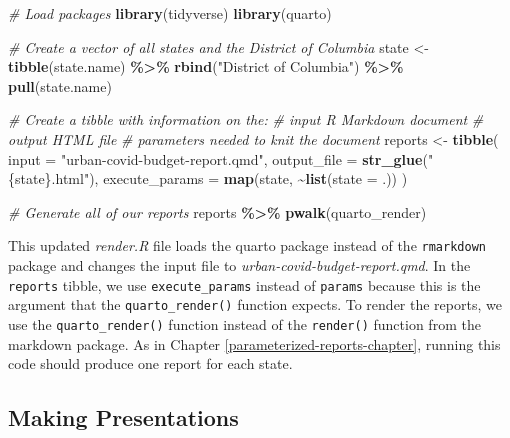 \documentclass[
]{book}
\newenvironment{Shaded}{\begin{snugshade}}{\end{snugshade}}
\newcommand{\AttributeTok}[1]{\textcolor[rgb]{0.13,0.29,0.53}{#1}}
\newcommand{\CommentTok}[1]{\textcolor[rgb]{0.56,0.35,0.01}{\textit{#1}}}
\newcommand{\FunctionTok}[1]{\textcolor[rgb]{0.13,0.29,0.53}{\textbf{#1}}}
\newcommand{\NormalTok}[1]{#1}
\newcommand{\OtherTok}[1]{\textcolor[rgb]{0.56,0.35,0.01}{#1}}
\newcommand{\SpecialCharTok}[1]{\textcolor[rgb]{0.81,0.36,0.00}{\textbf{#1}}}
\newcommand{\StringTok}[1]{\textcolor[rgb]{0.31,0.60,0.02}{#1}}
\begin{document}
\begin{Shaded}
\begin{Highlighting}[]
\CommentTok{\# Load packages}
\FunctionTok{library}\NormalTok{(tidyverse)}
\FunctionTok{library}\NormalTok{(quarto)}

\CommentTok{\# Create a vector of all states and the District of Columbia}
\NormalTok{state }\OtherTok{\textless{}{-}} \FunctionTok{tibble}\NormalTok{(state.name) }\SpecialCharTok{\%\textgreater{}\%}
  \FunctionTok{rbind}\NormalTok{(}\StringTok{"District of Columbia"}\NormalTok{) }\SpecialCharTok{\%\textgreater{}\%} 
  \FunctionTok{pull}\NormalTok{(state.name)}

\CommentTok{\# Create a tibble with information on the:}
\CommentTok{\# input R Markdown document}
\CommentTok{\# output HTML file}
\CommentTok{\# parameters needed to knit the document}
\NormalTok{reports }\OtherTok{\textless{}{-}} \FunctionTok{tibble}\NormalTok{(}
  \AttributeTok{input =} \StringTok{"urban{-}covid{-}budget{-}report.qmd"}\NormalTok{,}
  \AttributeTok{output\_file =} \FunctionTok{str\_glue}\NormalTok{(}\StringTok{"\{state\}.html"}\NormalTok{),}
  \AttributeTok{execute\_params =} \FunctionTok{map}\NormalTok{(state, }\SpecialCharTok{\textasciitilde{}}\FunctionTok{list}\NormalTok{(}\AttributeTok{state =}\NormalTok{ .))}
\NormalTok{)}

\CommentTok{\# Generate all of our reports}
\NormalTok{reports }\SpecialCharTok{\%\textgreater{}\%}
  \FunctionTok{pwalk}\NormalTok{(quarto\_render)}
\end{Highlighting}
\end{Shaded}

This updated \emph{render.R} file loads the quarto package instead of the \texttt{rmarkdown} package and changes the input file to \emph{urban-covid-budget-report.qmd}. In the \texttt{reports} tibble, we use \texttt{execute\_params} instead of \texttt{params} because this is the argument that the \texttt{quarto\_render()} function expects. To render the reports, we use the \texttt{quarto\_render()} function instead of the \texttt{render()} function from the markdown package. As in Chapter \ref{parameterized-reports-chapter}, running this code should produce one report for each state.

\hypertarget{making-presentations}{%
\subsection*{Making Presentations}\label{making-presentations}}
\end{document}
